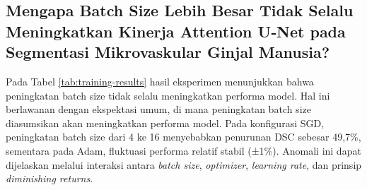 \subsection{Mengapa Batch Size Lebih Besar Tidak Selalu Meningkatkan Kinerja Attention U‑Net pada Segmentasi Mikrovaskular Ginjal Manusia?}

Pada Tabel \ref{tab:training-results} hasil eksperimen menunjukkan bahwa peningkatan batch size tidak selalu meningkatkan performa model. Hal ini berlawanan dengan ekspektasi umum, di mana peningkatan batch size diasumsikan akan meningkatkan performa model. Pada konfigurasi SGD, peningkatan batch size dari 4 ke 16 menyebabkan penurunan DSC sebesar 49{,}7\%, sementara pada Adam, fluktuasi performa relatif stabil (±1\%). Anomali ini dapat dijelaskan melalui interaksi antara \textit{batch size}, \textit{optimizer}, \textit{learning rate}, dan prinsip \textit{diminishing returns}.

